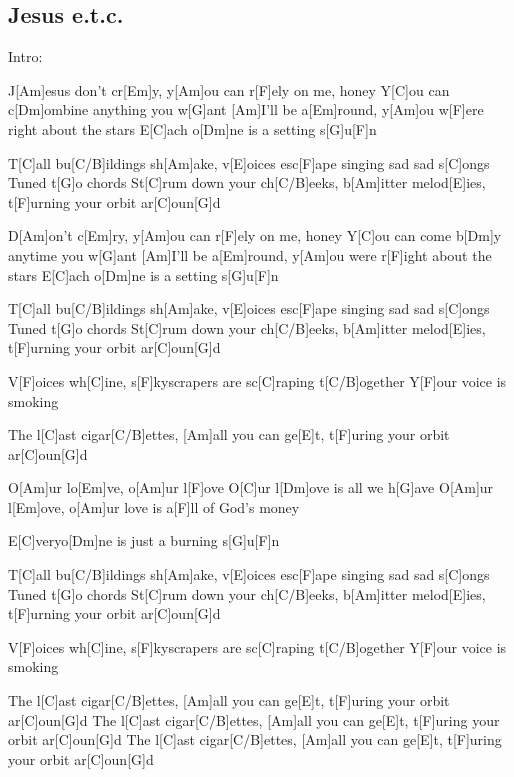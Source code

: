 \subsection*{Jesus e.t.c.   }
\begin{guitar}
Intro:

J[Am]esus don't cr[Em]y,  y[Am]ou can r[F]ely on me, honey
Y[C]ou can c[Dm]ombine anything you w[G]ant
[Am]I'll be a[Em]round, y[Am]ou w[F]ere right about the stars
E[C]ach o[Dm]ne is a setting s[G]u[F]n



T[C]all bu[C/B]ildings sh[Am]ake, v[E]oices esc[F]ape singing sad sad s[C]ongs
Tuned t[G]o chords
St[C]rum down your ch[C/B]eeks, b[Am]itter melod[E]ies, t[F]urning your orbit ar[C]oun[G]d



D[Am]on't c[Em]ry, y[Am]ou can r[F]ely on me, honey
Y[C]ou can come b[Dm]y anytime you w[G]ant
[Am]I'll be a[Em]round, y[Am]ou were r[F]ight about the stars
E[C]ach o[Dm]ne is a setting s[G]u[F]n



T[C]all bu[C/B]ildings sh[Am]ake, v[E]oices esc[F]ape singing sad sad s[C]ongs
Tuned t[G]o chords
St[C]rum down your ch[C/B]eeks, b[Am]itter melod[E]ies, t[F]urning your orbit ar[C]oun[G]d



V[F]oices wh[C]ine, s[F]kyscrapers are sc[C]raping t[C/B]ogether
Y[F]our voice is smoking



The l[C]ast cigar[C/B]ettes, [Am]all you can ge[E]t, t[F]uring your orbit ar[C]oun[G]d



O[Am]ur lo[Em]ve, o[Am]ur l[F]ove
O[C]ur l[Dm]ove is all we h[G]ave
O[Am]ur l[Em]ove, o[Am]ur love is a[F]ll of God's money



E[C]veryo[Dm]ne is just a burning s[G]u[F]n



T[C]all bu[C/B]ildings sh[Am]ake, v[E]oices esc[F]ape singing sad sad s[C]ongs
Tuned t[G]o chords
St[C]rum down your ch[C/B]eeks, b[Am]itter melod[E]ies, t[F]urning your orbit ar[C]oun[G]d



V[F]oices wh[C]ine, s[F]kyscrapers are sc[C]raping t[C/B]ogether
Y[F]our voice is smoking



The l[C]ast cigar[C/B]ettes, [Am]all you can ge[E]t, t[F]uring your orbit ar[C]oun[G]d
The l[C]ast cigar[C/B]ettes, [Am]all you can ge[E]t, t[F]uring your orbit ar[C]oun[G]d
The l[C]ast cigar[C/B]ettes, [Am]all you can ge[E]t, t[F]uring your orbit ar[C]oun[G]d
\end{guitar}

